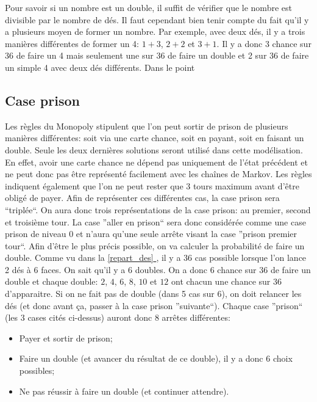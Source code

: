 \documentclass[letterpaper]{article}
\newcommand*{\fullref}[1]{\hyperref[{#1}]{\autoref*{#1} \nameref*{#1}}}
\begin{document}
    Pour savoir si un nombre est un double, il suffit de vérifier que le nombre est divisible
    par le nombre de dés.  Il faut cependant bien tenir compte du fait qu'il y a plusieurs
    moyen de former un nombre.  Par exemple, avec deux dés, il y a trois manières différentes
    de former un 4: $1+3$, $2+2$ et $3+1$.  Il y a donc 3 chance sur 36 de faire un 4 mais
    seulement une sur 36 de faire un double et 2 sur 36 de faire un simple 4 avec deux dés
    différents.
    Dans le point %
    
  \subsection{Case prison}
    \label{case_prison}
    Les règles du Monopoly stipulent que l'on peut sortir de prison de plusieurs manières 
    différentes: soit via une carte chance, soit en payant, soit en faisant un double.
    Seule les deux dernières solutions seront utilisé dans cette modélisation.  En effet,
    avoir une carte chance ne dépend pas uniquement de l'état précédent et ne peut donc
    pas être représenté facilement avec les chaînes de Markov. Les règles indiquent 
    également que l'on ne peut rester que 3 tours maximum avant d'être obligé de payer.
    Afin de représenter ces différentes cas, la case prison sera ``triplée``.  On aura
    donc trois représentations de la case prison: au premier, second et troisième tour.
    La case ''aller en prison`` sera donc considérée comme une case prison de niveau 0 et
    n'aura qu'une seule arrête visant la case ''prison premier tour``.
    Afin d'être le plus précis possible, on va calculer la probabilité de faire un double.
    Comme vu dans la \fullref{repart_des}, il y a 36 cas possible lorsque l'on lance 
    2 dés à 6 faces.  On sait qu'il y a 6 doubles.  On a donc 6 chance sur 36 de faire un
    double et chaque double: $2$, $4$, $6$, $8$, $10$ et $12$ ont chacun une chance sur 36
    d'apparaitre.  Si on ne fait pas de double (dans 5 cas sur 6), on doit relancer les 
    dés (et donc avant ça, passer à la case prison ''suivante``).
    Chaque case ''prison`` (les 3 cases cités ci-dessus) auront donc 8 arrêtes différentes:
    \begin{itemize}
     \item Payer et sortir de prison;
     \item Faire un double (et avancer du résultat de ce double), il y a donc 6 choix possibles;
     \item Ne pas réussir à faire un double (et continuer attendre).
    \end{itemize}
    
\end{document}
